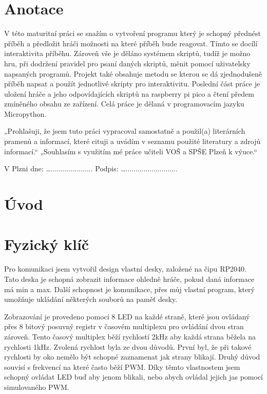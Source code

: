 \documentclass[12pt,a4paper]{article}
\begin{document}



\newpage

\section*{Anotace}
V této maturitní práci se snažím o vytvoření programu který je schopný přednést příběh a předložit hráči možnosti na které příběh bude reagovat. Tímto se docílí interaktivita příběhu. Zároveň vše je děláno systémem skriptů, tudíž je možno hru, při dodržení pravidel pro psaní daných skriptů, měnit pomocí uživatelsky napsaných programů. Projekt také obsahuje metodu se kterou se dá zjednodušeně příběh napsat a použít jednotlivé skripty pro interaktivitu. Poslední část práce je uložení hráče a jeho odpovídajících skriptů na raspberry pi pico a čtení předem zmíněného obsahu ze zařízení. Celá práce je dělaná v programovacím jazyku Micropython.


\vspace*{\fill}

„Prohlašuji, že jsem tuto práci vypracoval samostatně a použil(a) literárních pramenů a informací, které cituji a uvádím v seznamu použité literatury a zdrojů informací.“ 
„Souhlasím s využitím mé práce učiteli VOŠ a SPŠE Plzeň k výuce.“ 
\begin{flushright}
	V Plzni dne: …..................... Podpis: …..........................
\end{flushright} 

\newpage
\tableofcontents
\newpage

\section*{Úvod}
\section{Fyzický klíč}
Pro komunikaci jsem vytvořil design vlastní desky, založené na čipu RP2040. Tato deska je schopná zobrazit informace ohledně hráče, pokud daná informace má min a max. Další schopnost je komunikace, přes můj vlastní program, který umožňuje ukládání některých souborů na paměť desky.

Zobrazování je provedeno pomocí 8 LED na každé straně, které jsou ovládaný přes 8 bitový posuvný registr v časovém multiplexu pro ovládání dvou stran zároveň. Tento časový multiplex běží rychlostí 2kHz aby každá strana běžela na rychlosti 1kHz. Zvolená rychlost byla ze dvou důvodů. První byl, že při takové rychlosti by oko nemělo být schopné zaznamenat jak strany blikají. Druhý důvod souvisí s frekvencí na které často běží PWM. Díky těmto vlastnostem jsem schopný ovládat LED buď aby jenom blikali, nebo abych ovládal jejich jas pomocí simulovaného PWM.
\end{document}
